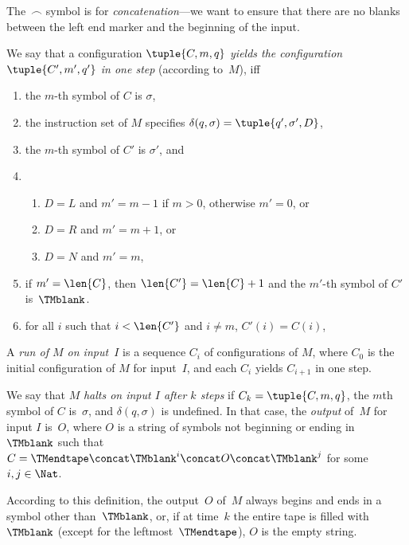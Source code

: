 \documentclass[../../../include/open-logic-section]{subfiles}
\begin{document}
\begin{explain}
The~$\frown$ symbol is for \emph{concatenation}---we want to
ensure that there are no blanks between the left end marker and
the beginning of the input.
\end{explain}

\begin{defn}
We say that a configuration $\tuple{C, m, q}$ \emph{yields the
  configuration $\tuple{C', m', q'}$ in one step} (according to~$M$),
  iff
\begin{enumerate}
\item the $m$-th symbol of $C$ is $\sigma$,
\item the instruction set of $M$ specifies $\delta(q, \sigma) =
  \tuple{q', \sigma', D}$,
\item the $m$-th symbol of $C'$ is $\sigma'$, and 
\item
\begin{enumerate}
\item $D = L$ and $m' = m - 1$ if $m>0$, otherwise $m'=0$, or
\item $D = R$ and $m' = m + 1$, or
\item $D = N$ and $m' = m$,
\end{enumerate}
\item if $m' = \len{C}$, then $\len{C'} = \len{C} + 1$ and the $m'$-th
  symbol of $C'$ is~$\TMblank$.
\item for all $i$ such that $i < \len{C'}$ and $i \neq m$, $C'(i) = C(i)$,
\end{enumerate}
\end{defn}

\begin{defn}
A \emph{run of $M$ on input~$I$} is a sequence $C_i$ of configurations
of $M$, where $C_0$ is the initial configuration of $M$ for input~$I$,
and each $C_i$ yields $C_{i+1}$ in one step.

We say that $M$ \emph{halts on input $I$ after $k$ steps} if $C_k =
\tuple{C, m, q}$, the $m$th symbol of $C$ is~$\sigma$, and $\delta(q,
\sigma)$ is undefined.  In that case, the \emph{output} of~$M$ for
input $I$ is~$O$, where $O$ is a string of symbols not beginning or
ending in~$\TMblank$ such that $C = \TMendtape \concat \TMblank^i
\concat O \concat \TMblank^j$ for some~$i, j \in \Nat$.
\end{defn}

\begin{explain}
According to this definition, the output~$O$ of~$M$ always begins and
ends in a symbol other than~$\TMblank$, or, if at time~$k$ the entire
tape is filled with~$\TMblank$ (except for the leftmost~$\TMendtape$),
$O$ is the empty string.
\end{explain}
\end{document}
